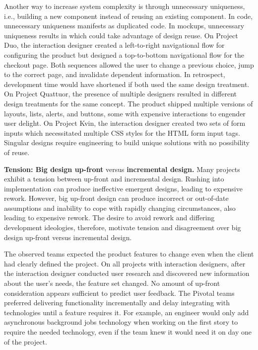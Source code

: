 Another way to increase system complexity is through unnecessary uniqueness, i.e., building a new component instead of reusing an existing component. In code, unnecessary uniqueness manifests as duplicated code. In mockups, unnecessary uniqueness results in  which could take advantage of design reuse. On Project Duo, the interaction designer created a left-to-right navigational flow for configuring the product but designed a top-to-bottom navigational flow for the checkout page. Both sequences allowed the user to change a previous choice, jump to the correct page, and invalidate dependent information. In retrospect, development time would have shortened if both used the same design treatment. On Project Quattuor, the presence of multiple designers resulted in different design treatments for the same concept. The product shipped multiple versions of layouts, lists, alerts, and buttons, some with expensive interactions to engender user delight. On Project Kvin, the interaction designer created two sets of form inputs which necessitated multiple CSS styles for the HTML form input tags. Singular designs require engineering to build unique solutions with no possibility of reuse.   

\textbf{Tension:  Big design up-front} versus \textbf{incremental design.}
Many projects exhibit a tension between up-front and incremental design. Rushing into implementation can produce ineffective emergent designs, leading to expensive rework. However, big up-front design can produce incorrect or out-of-date assumptions and inability to cope with rapidly changing circumstances, also leading to expensive rework. The desire to avoid rework and differing development ideologies, therefore, motivate tension and disagreement over big design up-front versus incremental design. 

The observed teams expected the product features to change even when the client had clearly defined the project. On all projects with interaction designers, after the interaction designer conducted user research and discovered new information about the user's needs, the feature set changed. No amount of up-front consideration appears sufficient to predict user feedback. The Pivotal teams preferred delivering functionality incrementally and delay integrating with technologies until a feature requires it. For example, an engineer would only add asynchronous background jobs technology when working on the first story to require the needed technology, even if the team knew it would need it on day one of the project.


